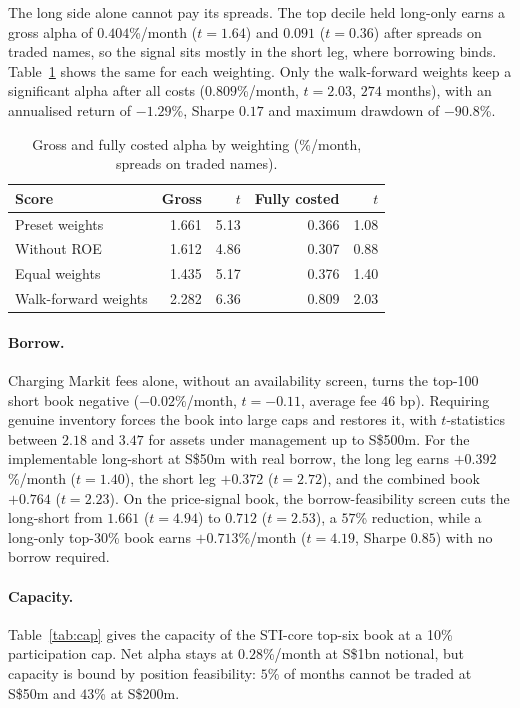\documentclass[11pt,a4paper]{article}
\begin{document}
The long side alone cannot pay its spreads. The top decile held long-only earns a gross alpha of $0.404$\%/month ($t=1.64$) and $0.091$ ($t=0.36$) after spreads on traded names, so the signal sits mostly in the short leg, where borrowing binds. Table~\ref{tab:wfall} shows the same for each weighting. Only the walk-forward weights keep a significant alpha after all costs ($0.809$\%/month, $t=2.03$, $274$ months), with an annualised return of $-1.29$\%, Sharpe $0.17$ and maximum drawdown of $-90.8$\%.

\begin{table}[h]
\centering
\caption{Gross and fully costed alpha by weighting (\%/month, spreads on traded names).}
\label{tab:wfall}
\begin{tabular}{lrrrr}
\toprule
Score & Gross & $t$ & Fully costed & $t$ \\
\midrule
Preset weights & 1.661 & 5.13 & 0.366 & 1.08 \\
Without ROE & 1.612 & 4.86 & 0.307 & 0.88 \\
Equal weights & 1.435 & 5.17 & 0.376 & 1.40 \\
Walk-forward weights & 2.282 & 6.36 & 0.809 & 2.03 \\
\bottomrule
\end{tabular}
\end{table}

\paragraph{Borrow.} Charging Markit fees alone, without an availability screen, turns the top-100 short book negative ($-0.02$\%/month, $t=-0.11$, average fee $46$ bp). Requiring genuine inventory forces the book into large caps and restores it, with $t$-statistics between $2.18$ and $3.47$ for assets under management up to S\$500m. For the implementable long-short at S\$50m with real borrow, the long leg earns $+0.392$\%/month ($t=1.40$), the short leg $+0.372$ ($t=2.72$), and the combined book $+0.764$ ($t=2.23$). On the price-signal book, the borrow-feasibility screen cuts the long-short from $1.661$ ($t=4.94$) to $0.712$ ($t=2.53$), a $57$\% reduction, while a long-only top-30\% book earns $+0.713$\%/month ($t=4.19$, Sharpe $0.85$) with no borrow required.

\paragraph{Capacity.} Table~\ref{tab:cap} gives the capacity of the STI-core top-six book at a 10\% participation cap. Net alpha stays at $0.28$\%/month at S\$1bn notional, but capacity is bound by position feasibility: $5$\% of months cannot be traded at S\$50m and $43$\% at S\$200m.
\end{document}
